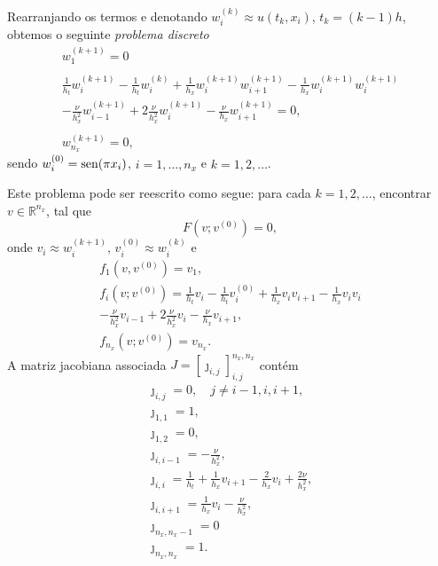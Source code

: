 \begin{ex}
  Rearranjando os termos e denotando $w^{(k)}_i\approx u(t_k, x_i)$, $t_k = (k-1)h$, obtemos o seguinte \emph{problema discreto}
  \begin{gather}
    w^{(k+1)}_1 = 0\\
    ~\nonumber\\
    \frac{1}{h_t}w^{(k+1)}_i - \frac{1}{h_t}w^{(k)}_i + \frac{1}{h_x}w^{(k+1)}_iw^{(k+1)}_{i+1} - \frac{1}{h_x}w^{(k+1)}_iw^{(k+1)}_i \\
    - \frac{\nu}{h_x^2}w^{(k+1)}_{i-1} + 2\frac{\nu}{h_x^2}w^{(k+1)}_i - \frac{\nu}{h_x}w^{(k+1)}_{i+1} = 0,\\
    ~\nonumber\\
    w^{(k+1)}_{n_x} = 0,
  \end{gather}
  sendo $w^{(0)}_i = \operatorname{sen}(\pi x_i)$, $i=1,\dotsc,n_x$ e $k=1,2,\ldots$.

  Este problema pode ser reescrito como segue: para cada $k=1,2,\ldots$, encontrar $v\in\mathbb{R}^{n_x}$, tal que
  \begin{equation}
    F(v; v^{(0)}) = 0, 
  \end{equation}
  onde $v_{i} \approx w^{(k+1)}_i$, $v_{i}^{(0)} \approx w^{(k)}_{i}$ e
  \begin{gather}
    f_1(v,v^{(0)}) = v_1,\\
    f_{i}(v;v^{(0)}) = \frac{1}{h_t}v_i - \frac{1}{h_t}v^{(0)}_i + \frac{1}{h_x}v_iv_{i+1} - \frac{1}{h_x}v_iv_i \\
    - \frac{\nu}{h_x^2}v_{i-1} + 2\frac{\nu}{h_x^2}v_i - \frac{\nu}{h_x}v_{i+1},\\
    f_{n_x}(v;v^{(0)}) = v_{n_x}.
  \end{gather}
  A matriz jacobiana associada $J=[\jmath_{i,j}]_{i,j}^{n_x,n_x}$ contém
  \begin{gather}
    \jmath_{i,j} = 0,\quad j\neq i-1,i,i+1,\\
    \jmath_{1,1} = 1,\\
    \jmath_{1,2} = 0,\\
    \jmath_{i,i-1} = -\frac{\nu}{h_x^2},\\
    \jmath_{i,i} = \frac{1}{h_t} + \frac{1}{h_x}v_{i+1} - \frac{2}{h_x}v_i + \frac{2\nu}{h_x^2},\\
    \jmath_{i,i+1} = \frac{1}{h_x}v_{i} - \frac{\nu}{h_x^2},\\
    \jmath_{n_x,n_x-1} = 0\\
    \jmath_{n_x,n_x} = 1.
  \end{gather}
\end{ex}

